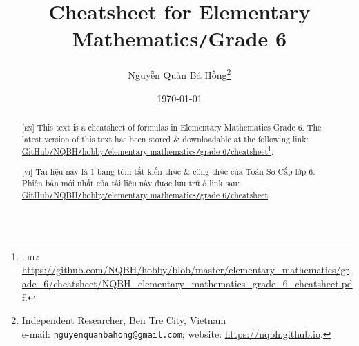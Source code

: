 \documentclass{article}
\title{Cheatsheet for Elementary Mathematics\texttt{/}Grade 6}
\author{Nguyễn Quản Bá Hồng\footnote{Independent Researcher, Ben Tre City, Vietnam\\e-mail: \texttt{nguyenquanbahong@gmail.com}; website: \url{https://nqbh.github.io}.}}
\date{\today}
\begin{document}
\maketitle
\begin{abstract}
	\textsc{[en]} This text is a cheatsheet of formulas in Elementary Mathematics Grade 6. The latest version of this text has been stored \& downloadable at the following link: \href{https://github.com/NQBH/hobby/blob/master/elementary_mathematics/grade_6/cheatsheet/NQBH_elementary_mathematics_grade_6_cheatsheet.pdf}{GitHub\texttt{/}NQBH\texttt{/}hobby\texttt{/}elementary mathematics\texttt{/}grade 6\texttt{/}cheatsheet}\footnote{\textsc{url}: \url{https://github.com/NQBH/hobby/blob/master/elementary_mathematics/grade_6/cheatsheet/NQBH_elementary_mathematics_grade_6_cheatsheet.pdf}.}.
	\vspace{2mm}

	\textsc{[vi]} Tài liệu này là 1 bảng tóm tắt kiến thức \& công thức của Toán Sơ Cấp lớp 6. Phiên bản mới nhất của tài liệu này được lưu trữ ở link sau: \href{https://github.com/NQBH/hobby/blob/master/elementary_mathematics/grade_6/cheatsheet/NQBH_elementary_mathematics_grade_6_cheatsheet.pdf}{GitHub\texttt{/}NQBH\texttt{/}hobby\texttt{/}elementary mathematics\texttt{/}grade 6\texttt{/}cheatsheet}.
\end{abstract}
\tableofcontents

\end{document}
